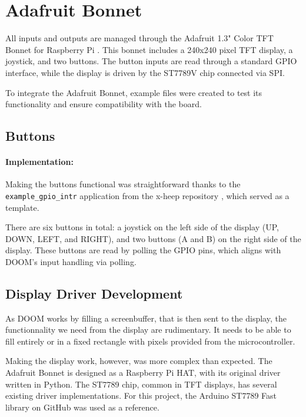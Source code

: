 \section{Adafruit Bonnet}

All inputs and outputs are managed through the Adafruit 1.3" Color TFT Bonnet for Raspberry Pi \cite{adafruitwebsite}. This bonnet includes a 240x240 pixel TFT display, a joystick, and two buttons. The button inputs are read through a standard GPIO interface, while the display is driven by the ST7789V chip connected via SPI.

To integrate the Adafruit Bonnet, example files were created to test its functionality and ensure compatibility with the board.

\subsection{Buttons}

\paragraph{Implementation:}
Making the buttons functional was straightforward thanks to the \texttt{example\_gpio\_intr} application from the x-heep repository \cite{xHeepRepo}, which served as a template.

There are six buttons in total: a joystick on the left side of the display (UP, DOWN, LEFT, and RIGHT), and two buttons (A and B) on the right side of the display. These buttons are read by polling the GPIO pins, which aligns with DOOM's input handling via polling.

\subsection{Display Driver Development}

As DOOM works by filling a screenbuffer, that is then sent to the display, the functionnality we need from the display are rudimentary. It needs to be able to fill entirely or in a fixed rectangle with pixels provided from the microcontroller.

Making the display work, however, was more complex than expected. The Adafruit Bonnet is designed as a Raspberry Pi HAT, with its original driver written in Python. The ST7789 chip, common in TFT displays, has several existing driver implementations. For this project, the Arduino ST7789 Fast library on GitHub \cite{arduinoST7789} was used as a reference.

